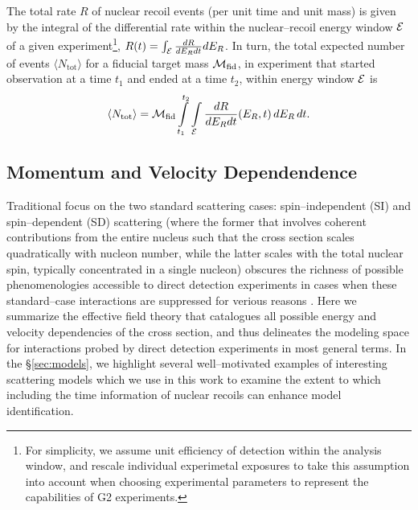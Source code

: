 \documentclass[11pt]{article}
\newcommand{\beq}{\begin{equation}} \newcommand{\eeq}{\end{equation}}
\newcommand{\sjwColor}{red}
\newcommand{\sjwtt}[1]{{\color{\sjwColor}\tt #1}}
\begin{document}
The total rate $R$ of nuclear recoil events (per unit time and unit mass) is given by the integral of the differential rate within the nuclear--recoil energy window ${\cal E}$ of a given experiment\footnote{For simplicity, we assume unit efficiency of detection within the analysis window, and rescale individual experimetal exposures to take this assumption into account when choosing experimental parameters to represent the capabilities of G2 experiments.}, $R(t)=\int_{\cal E} \frac{dR}{dE_R dt} dE_R$. In turn, the total expected number of events $\langle N_\mathrm{tot}\rangle$ for a fiducial target mass ${\cal M}_\textrm{fid}$, in experiment that started observation at a time $t_1$ and ended at a time $t_2$, within energy window ${\cal E}$ is
\beq
\langle N_\mathrm{tot}\rangle =  \cM_\textrm{fid} \int\limits_{t_1}^{t_2} \int\limits_\cE  \frac{dR}{dE_R dt}(E_R,t)\,dE_R \,dt.
\eeq

\subsection{Momentum and Velocity Dependendence}
\label{subsec:momentum_velocity}

Traditional focus on the two standard scattering cases: spin--independent (SI) and spin--dependent (SD) scattering (where the former that involves coherent contributions from the entire nucleus such that the cross section scales quadratically with nucleon number, while the latter scales with the total nuclear spin, typically concentrated in a single nucleon) obscures the richness of possible phenomenologies accessible to direct detection experiments in cases when these standard--case interactions are suppressed for verious reasons \cite{}. Here we summarize the effective field theory that catalogues all possible energy and velocity dependencies of the cross section, and thus delineates the modeling space for interactions probed by direct detection experiments in most general terms. In the \S\ref{sec:models}, we highlight several well--motivated examples of interesting scattering models which we use in this work to examine the extent to which including the time information of nuclear recoils can enhance model identification.

\end{document}
